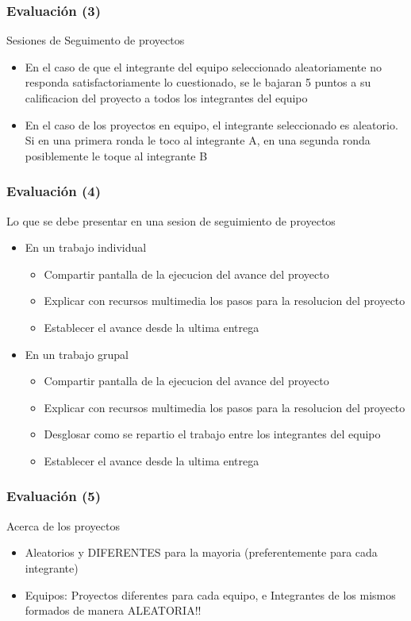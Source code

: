\begin{frame}
\frametitle{Evaluación (3)}
Sesiones de Seguimento de proyectos
\begin{itemize}
\item En el caso de que el integrante del equipo seleccionado aleatoriamente no responda satisfactoriamente lo cuestionado, se le bajaran 5 puntos a su calificacion del proyecto a todos los integrantes del equipo
\item En el caso de los proyectos en equipo, el integrante seleccionado es aleatorio. Si en una primera ronda le toco al integrante A, en una segunda ronda posiblemente le toque al integrante B
\end{itemize}
\end{frame}



\begin{frame}
\frametitle{Evaluación (4)}
Lo que se debe presentar en una sesion de seguimiento de proyectos
\begin{itemize}
\item En un trabajo individual
\begin{itemize}
\item Compartir pantalla de la ejecucion del avance del proyecto
\item Explicar con recursos multimedia los pasos para la resolucion del proyecto
\item Establecer el avance desde la ultima entrega
\end{itemize}
\item En un trabajo grupal
\begin{itemize}
\item Compartir pantalla de la ejecucion del avance del proyecto
\item Explicar con recursos multimedia los pasos para la resolucion del proyecto
\item Desglosar como se repartio el trabajo entre los integrantes del equipo
\item Establecer el avance desde la ultima entrega
\end{itemize}
\end{itemize}
\end{frame}



\begin{frame}
\frametitle{Evaluación (5)}
Acerca de los proyectos
\begin{itemize}
\item Aleatorios y DIFERENTES para la mayoria (preferentemente para cada integrante)
\item Equipos: Proyectos diferentes para cada equipo, e Integrantes de los mismos formados de manera ALEATORIA!!
\end{itemize}
\end{frame}



